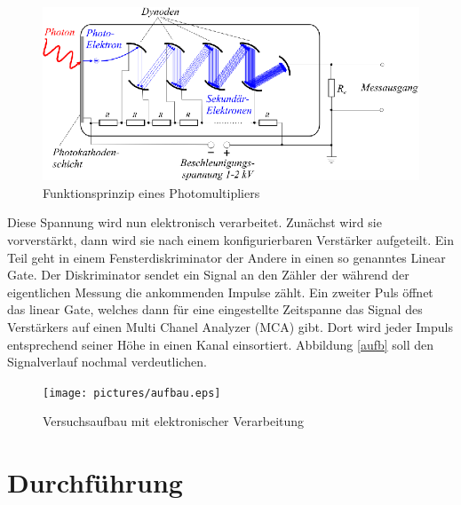 \documentclass[12pt]{article}
\begin{document}
\begin{figure}[H]
 \includegraphics[width=0.9\linewidth]{pictures/photomultiplier_schema.eps}
 \caption{Funktionsprinzip eines Photomultipliers}
\end{figure}
\label{photo}

Diese Spannung wird nun elektronisch verarbeitet. Zunächst wird sie vorverstärkt, dann wird sie nach einem konfigurierbaren Verstärker aufgeteilt.
Ein Teil geht in einem Fensterdiskriminator der Andere in einen so genanntes Linear Gate. Der Diskriminator sendet ein Signal an den Zähler der 
während der eigentlichen Messung die ankommenden Impulse zählt. Ein zweiter Puls öffnet das linear Gate, welches dann für eine eingestellte Zeitspanne das 
Signal des Verstärkers auf einen Multi Chanel Analyzer (MCA) gibt. Dort wird jeder Impuls entsprechend seiner Höhe in einen Kanal einsortiert. Abbildung \ref{aufb} soll 
den Signalverlauf nochmal verdeutlichen.
\begin{figure}[H]
 \texttt{[image: pictures/aufbau.eps]}
 \caption{Versuchsaufbau mit elektronischer Verarbeitung}
\end{figure}
\label{aufb}
\section{Durchführung}
\end{document}
